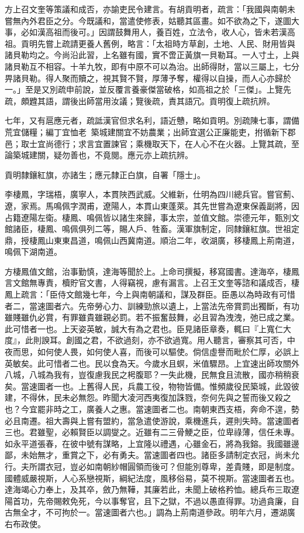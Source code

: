\begin{pinyinscope}
方上召文奎等策議和成否，亦諭吏民令建言。有胡貢明者，疏言：「我國與南朝未嘗無內外君臣之分。今既議和，當遣使修表，姑聽其區畫。如不欲為之下，遂圖大事，必如漢高祖而後可。」因謂鼓舞用人，養百姓，立法令，收人心，皆未若漢高祖。貢明先嘗上疏請更養人舊例，略言：「太祖時方草創，土地、人民、財用皆與諸貝勒均之。今尚沿此習，上名雖有國，實不啻正黃旗一貝勒耳。一人寸土，上與諸貝勒互不相容。十羊九牧，即有中原不可以為治。出師得財，當以三屬上，七分畀諸貝勒。得人聚而贖之，視其賢不賢，厚薄予奪，權得以自操，而人心亦歸於一。」至是又別疏申前說，並反覆言養豪傑當破格，如高祖之於「三傑」。上覽先疏，頗韙其語，謂後出師當用汝議；覽後疏，責其語冗。貢明復上疏抗辨。

七年，又有扈應元者，疏詆漢官但求名利，語近戇，略如貢明。別疏陳七事，謂備荒宜儲糧；編丁宜恤老；築城建關宜不妨農業；出師宜選公正廉能吏，拊循新下郡邑；取士宜尚德行；求言宜置諫官；乘機取天下，在人心不在火器。上覽其疏，至論築城建關，疑勿善也，不竟閱。應元亦上疏抗辨。

貢明隸鑲紅旗，亦諸生；應元隸正白旗，自署「隱士」。

李棲鳳，字瑞梧，廣寧人，本貫陜西武威。父維新，仕明為四川總兵官。嘗官薊、遼，家焉。馬鳴佩字潤甫，遼陽人，本貫山東蓬萊。其先世嘗為遼東保義副將，因占籍遼陽左衛。棲鳳、鳴佩皆以諸生來歸，事太宗，並值文館。崇德元年，甄別文館諸臣，棲鳳、鳴佩俱列二等，賜人戶、牲畜。漢軍旗制定，同隸鑲紅旗。世祖定鼎，授棲鳳山東東昌道，鳴佩山西冀南道。順治二年，收湖廣，移棲鳳上荊南道，鳴佩下湖南道。

方棲鳳值文館，治事勤慎，達海等聞於上。上命司撰擬，移寫國書。達海卒，棲鳳言文館無專責，櫝貯官文書，人得竊視，慮有漏言。上召王文奎等諮和議成否，棲鳳上疏言：「臣侍文館幾七年，今上與南朝議和，謀及群臣。臣愚以為時政有可惜者二，當速圖者六。先帝勞心力、訓練勁旅以遺上，上當法先帝賞罰出獨斷，有功雖賤雖仇必賞，有罪雖貴雖親必罰。若不振奮鼓舞，必且習為洩洩，弛已成之業。此可惜者一也。上天姿英敏，誠大有為之君也。臣見諸臣章奏，輒曰『上寬仁大度』，此則諛耳。創國之君，不欲過刻，亦不欲過寬。用人聽言，審察其可否，中夜而思，如何使人畏，如何使人喜，而後可以驅使。倘信虛譽而毗於仁厚，必誤上英敏矣。此可惜者二也。民以食為天。今歲水且螟，米值驟昂。上宜速出師攻關外八城，八城為我有，豈復慮我民之枵腹耶？一失此機，民無食且流散，國亦稍稍衰矣。當速圖者一也。上舊得人民，兵農工役，物物皆備。惟頻歲役民築城，此毀彼建，不得休，民未必無怨。昨聞大凌河西夷復加誅戮，奈何先與之誓而後又殺之也？今宜罷非時之工，廣養人之惠。當速圖者二也。南朝東西支梧，奔命不遑，勢必且南遷。祖大壽與上嘗有盟約，當急遣使游說，乘機進兵，遲則失時。當速圖者三也。君雖聖，必賴賢臣以調燮之。近雖有二三骨鯁之臣，位卑祿薄，信任未專。如永平道張春，在彼中號有謀略，上宜隆以禮遇，心雖金石，將為我鎔。我國雖邊鄙，未始無才，重賞之下，必有勇夫。當速圖者四也。諸臣多請制定衣冠，尚未允行。夫所謂衣冠，豈必如南朝紗帽圓領而後可？但能別尊卑，差貴賤，即是制度。國體威嚴視斯，人心系戀視斯，綱紀法度，風移俗易，莫不視斯。當速圖者五也。達海竭心力奉上，及其卒，斂乃無鞾，其廉若此，未聞上破格矜恤。總兵布三取遼陽首功，先帝賜敕免死，今以事奪官，且下之獄，不過以愚直得罪。功過貪廉，自古無全才，不可拘於一。當速圖者六也。」調為上荊南道參政。明年六月，遷湖廣右布政使。


\end{pinyinscope}
